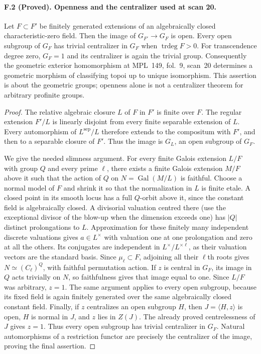 \paragraph{F.2 (Proved). Openness and the centralizer used at scan 20.}
Let $F\subset F'$ be finitely generated extensions of an algebraically
closed characteristic-zero field. Then the image of
$G_{F'}\to G_F$ is open. Every open subgroup of $G_F$ has trivial
centralizer in $G_F$ when $\operatorname{trdeg}F>0$. For transcendence
degree zero, $G_F=1$ and its centralizer is again the trivial group.
Consequently the geometric exterior homomorphism at MPL~149, fol.~9,
scan~20 determines a geometric morphism of classifying topoi up to unique
isomorphism. This assertion is about the geometric groups; openness alone
is not a centralizer theorem for arbitrary profinite groups.

\begin{proof}
The relative algebraic closure $L$ of $F$ in $F'$ is finite over $F$.
The regular extension $F'/L$ is linearly disjoint from every finite
separable extension of $L$. Every automorphism of $L^{\mathrm{sep}}/L$
therefore extends to the compositum with $F'$, and then to a separable
closure of $F'$. Thus the image is $G_L$, an open subgroup of $G_F$.

We give the needed slimness argument. For every finite Galois extension
$L/F$ with group $Q$ and every prime $\ell$, there exists a finite Galois
extension $M/F$ above it such that the action of $Q$ on
$N=\operatorname{Gal}(M/L)$ is faithful. Choose a normal model of $F$ and
shrink it so that the normalization in $L$ is finite etale. A closed point
in its smooth locus has a full $Q$-orbit above it, since the constant field
is algebraically closed. A divisorial valuation centred there (use the
exceptional divisor of the blow-up when the dimension exceeds one) has
$|Q|$ distinct prolongations to $L$. Approximation for these finitely many
independent discrete valuations gives $a\in L^\times$ with valuation one
at one prolongation and zero at all the others. Its conjugates are
independent in $L^\times/L^{\times\ell}$, as their valuation vectors are
the standard basis. Since $\mu_\ell\subset F$, adjoining all their
$\ell$th roots gives $N\simeq(C_\ell)^Q$, with faithful permutation action.
If $z$ is central in $G_F$, its image in $Q$ acts trivially on $N$,
so faithfulness gives that image equal to one. Since $L/F$ was arbitrary,
$z=1$. The same argument applies to every open subgroup, because its fixed
field is again finitely generated over the same algebraically closed
constant field. Finally, if $z$ centralizes an open subgroup $H$, then
$J=\langle H,z\rangle$ is open, $H$ is normal in $J$, and $z$ lies in
$Z(J)$. The already proved centrelessness of $J$ gives $z=1$. Thus every
open subgroup has trivial centralizer in $G_F$. Natural automorphisms of a restriction functor are precisely
the centralizer of the image, proving the final assertion.
\end{proof}

